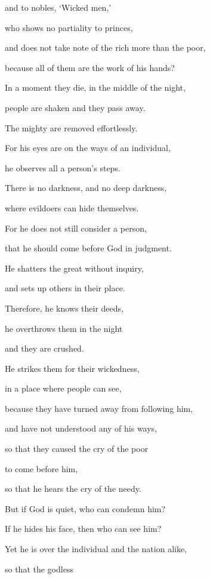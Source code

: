 {\par }{\Q and to nobles,
‘Wicked men,’
\par }{\Q {}who
shows no
partiality
to princes,
\par }{\Q and does not
take note of the rich more than the poor,
\par }{\Q because
all
of them are the work
of his hands?
\par }{\Q {}In a moment
they die,
in the middle
of the night,
\par }{\Q people
are shaken
and they pass
away.
\par }{\Q The mighty
are removed
effortlessly.
\par }{\Q {}For
his eyes
are on
the ways
of an individual,
\par }{\Q he observes
all
a person’s steps.
\par }{\Q {}There is no
darkness,
and no
deep darkness,
\par }{\Q where
evildoers
can hide
themselves.
\par }{\Q {}For
he does not
still
consider
a person,
\par }{\Q that he should come
before
God
in judgment.
\par }{\Q {}He shatters
the great
without
inquiry,
\par }{\Q and sets up
others
in their place.
\par }{\Q {}Therefore,
he knows
their deeds,
\par }{\Q he overthrows
them in the night
\par }{\Q and they are crushed.
\par }{\Q {}He strikes
them for their wickedness,
\par }{\Q in a place
where people can see,
\par }{\Q {}because
they have turned
away from following
him,
\par }{\Q and have not
understood
any
of his ways,
\par }{\Q {}so that they caused the cry
of the poor
\par }{\Q to come
before him,
\par }{\Q so that he hears
the cry
of the needy.
\par }{\Q {}But if God is quiet,
who
can condemn
him?
\par }{\Q If he hides
his face,
then who
can see
him?
\par }{\Q Yet he is over
the individual
and the nation
alike,
\par }{\Q {}so that the godless
}

